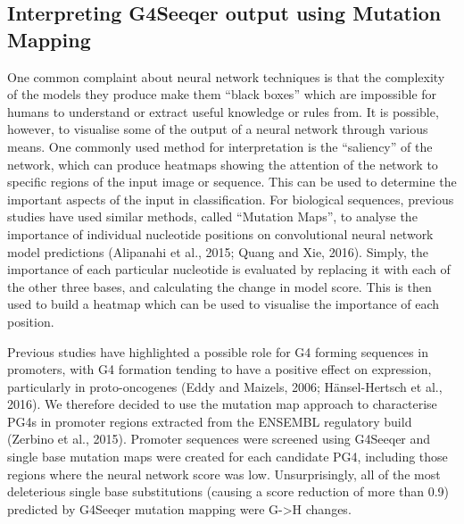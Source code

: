 \documentclass[12pt,a4paper,]{report}
\begin{document}
\newpage

\hypertarget{interpreting-g4seeqer-output-using-mutation-mapping}{%
\subsection{Interpreting G4Seeqer output using Mutation
Mapping}\label{interpreting-g4seeqer-output-using-mutation-mapping}}

One common complaint about neural network techniques is that the
complexity of the models they produce make them ``black boxes'' which
are impossible for humans to understand or extract useful knowledge or
rules from. It is possible, however, to visualise some of the output of
a neural network through various means. One commonly used method for
interpretation is the ``saliency'' of the network, which can produce
heatmaps showing the attention of the network to specific regions of the
input image or sequence. This can be used to determine the important
aspects of the input in classification. For biological sequences,
previous studies have used similar methods, called ``Mutation Maps'', to
analyse the importance of individual nucleotide positions on
convolutional neural network model predictions (Alipanahi et al., 2015;
Quang and Xie, 2016). Simply, the importance of each particular
nucleotide is evaluated by replacing it with each of the other three
bases, and calculating the change in model score. This is then used to
build a heatmap which can be used to visualise the importance of each
position.

Previous studies have highlighted a possible role for G4 forming
sequences in promoters, with G4 formation tending to have a positive
effect on expression, particularly in proto-oncogenes (Eddy and Maizels,
2006; Hänsel-Hertsch et al., 2016). We therefore decided to use the
mutation map approach to characterise PG4s in promoter regions extracted
from the ENSEMBL regulatory build (Zerbino et al., 2015). Promoter
sequences were screened using G4Seeqer and single base mutation maps
were created for each candidate PG4, including those regions where the
neural network score was low. Unsurprisingly, all of the most
deleterious single base substitutions (causing a score reduction of more
than 0.9) predicted by G4Seeqer mutation mapping were G-\textgreater{}H
changes.
\end{document}
